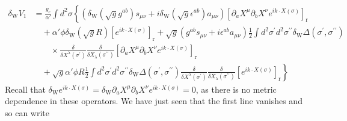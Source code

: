 \begin{tcolorbox}[breakable]
		\begin{align}
			\delta_{\mathrm{W}} V_1 &= \frac{g_c}{\alpha'} \int d^2 \sigma\left\{\left(\delta_{\mathrm{W}}\left(\sqrt{g} g^{a b}\right) s_{\mu \nu}+i \delta_{\mathrm{W}}\left(\sqrt{g} \epsilon^{a b}\right) a_{\mu \nu}\right)\left[\partial_a X^\mu \partial_b X^\nu e^{i k \cdot X(\sigma)}\right]_{\mathrm{r}}\right. \nonumber \\
			&\quad + \alpha' \phi \delta_{\mathrm{W}}(\sqrt{g} R)\left[e^{i k \cdot X(\sigma)}\right]_{\mathrm{r}}  + \sqrt{g}\left(g^{a b} s_{\mu \nu}+i \epsilon^{a b} a_{\mu \nu}\right) \frac{1}{2} \int d^2 \sigma^{\prime} d^2 \sigma^{\prime \prime} \delta_{\mathrm{W}} \Delta\left(\sigma^{\prime}, \sigma^{\prime \prime}\right) \nonumber\\
			&\qquad\times \frac{\delta}{\delta X^\lambda\left(\sigma^{\prime}\right)}\frac{\delta}{\delta X_\lambda\left(\sigma^{\prime \prime}\right)}\left[\partial_a X^\mu \partial_b X^\nu e^{i k \cdot X(\sigma)}\right]_{\mathrm{r}} \nonumber \\
			&\left.\quad + \sqrt{g} \alpha' \phi R \frac{1}{2} \int d^2 \sigma^{\prime} d^2 \sigma^{\prime \prime} \delta_{\mathrm{W}} \Delta\left(\sigma^{\prime}, \sigma^{\prime \prime}\right) \frac{\delta}{\delta X^\lambda\left(\sigma^{\prime}\right)} \frac{\delta}{\delta X_\lambda\left(\sigma^{\prime \prime}\right)}\left[e^{i k \cdot X(\sigma)}\right]_{\mathrm{r}}\right\}
		\end{align}
		Recall that $\delta_{\mathrm{W}} e^{i k \cdot X(\sigma)} = \delta_{\mathrm{W}} \partial_a X^\mu \partial_b X^\nu e^{i k \cdot X(\sigma)} = 0$, as there is no metric dependence in these operators. We have just seen that the first line vanishes and so can write
		

\end{tcolorbox}
